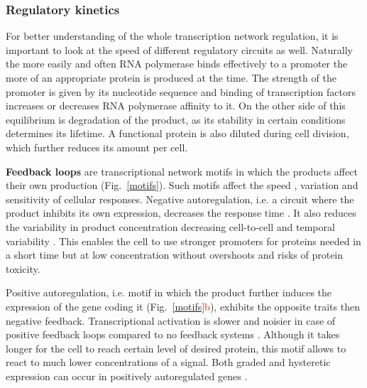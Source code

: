 \subsubsection{Regulatory kinetics}
For better understanding of the whole transcription network regulation, it is important to look at the speed of different regulatory circuits as well.
Naturally the more easily and often RNA polymerase binds effectively to a promoter the more of an appropriate protein is produced at the time.
The strength of the promoter is given by its nucleotide sequence and binding of transcription factors increases or decreases RNA polymerase affinity to it.
On the other side of this equilibrium is degradation of the product, as its stability in certain conditions determines its lifetime.
A functional protein is also diluted during cell division, which further reduces its amount per cell.

\textbf{Feedback loops} are transcriptional network motifs in which the products affect their own production  (Fig.~\ref{motifs}).
Such motifs affect the speed , variation and sensitivity of cellular responses.
Negative autoregulation, i.e. a circuit where the product inhibits its own expression, decreases the response time \cite{rosenfeld2002negative}.
It also reduces the variability in product concentration decreasing cell-to-cell and temporal variability \cite{becskei2000engineering}.
This enables the cell to use stronger promoters for proteins needed in a short time but at low concentration without overshoots and risks of protein toxicity.

Positive autoregulation, i.e. motif in which the product further induces the expression of the gene coding it (Fig.~\ref{motifs}\textcolor{red}{b}), exhibits the opposite traits then negative feedback.
Transcriptional activation is slower and noisier in case of positive feedback loops compared to no feedback systems \cite{maeda2006regulatory, sayut2007noise}.
Although it takes longer for the cell to reach certain level of desired protein, this motif allows to react to much lower concentrations of a signal.
Both graded and hysteretic expression can occur in positively autoregulated genes \cite{maeda2006regulatory}.

